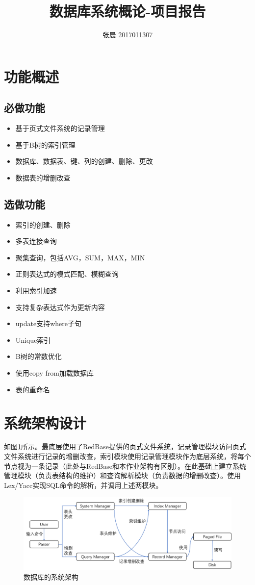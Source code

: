 \documentclass{article}
\title{数据库系统概论-项目报告}
\author{张晨 2017011307}
\begin{document}
\maketitle

\section{功能概述}
\subsection{必做功能}
\begin{itemize}
    \item 基于页式文件系统的记录管理
    \item 基于B树的索引管理
    \item 数据库、数据表、键、列的创建、删除、更改
    \item 数据表的增删改查
\end{itemize}
\subsection{选做功能}
\begin{itemize}
    \item 索引的创建、删除
    \item 多表连接查询
    \item 聚集查询，包括AVG，SUM，MAX，MIN
    \item 正则表达式的模式匹配、模糊查询
    \item 利用索引加速
    \item 支持复杂表达式作为更新内容
    \item update支持where子句
    \item Unique索引
    \item B树的常数优化
    \item 使用copy from加载数据库
    \item 表的重命名
\end{itemize}
\section{系统架构设计}
如图\ref{fig:structure}所示。最底层使用了RedBase提供的页式文件系统，记录管理模块访问页式文件系统进行记录的增删改查，索引模块使用记录管理模块作为底层系统，将每个节点视为一条记录（此处与RedBase和本作业架构有区别）。在此基础上建立系统管理模块（负责表结构的维护）和查询解析模块（负责数据的增删改查）。使用Lex/Yacc实现SQL命令的解析，并调用上述两模块。
\begin{figure}[htbp]
    \centering
    \includegraphics[width=.8\textwidth]{figure/structure.png}
    \caption{数据库的系统架构}
    \label{fig:structure}
\end{figure}
\end{document}
